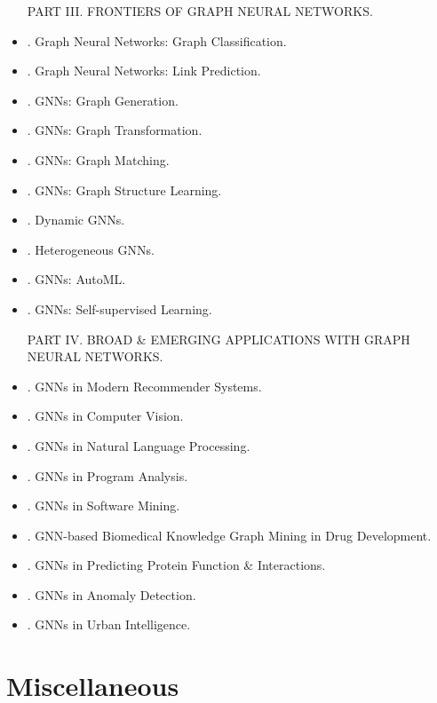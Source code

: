 \documentclass{article}
\begin{document}
\begin{itemize}
    PART III. FRONTIERS OF GRAPH NEURAL NETWORKS.
    \item {. Graph Neural Networks: Graph Classification.}
    \item {. Graph Neural Networks: Link Prediction.}
    \item {. GNNs: Graph Generation.}
    \item {. GNNs: Graph Transformation.}
    \item {. GNNs: Graph Matching.}
    \item {. GNNs: Graph Structure Learning.}
    \item {. Dynamic GNNs.}
    \item {. Heterogeneous GNNs.}
    \item {. GNNs: AutoML.}
    \item {. GNNs: Self-supervised Learning.}

    PART IV. BROAD \& EMERGING APPLICATIONS WITH GRAPH NEURAL NETWORKS.
    \item {. GNNs in Modern Recommender Systems.}
    \item {. GNNs in Computer Vision.}
    \item {. GNNs in Natural Language Processing.}
    \item {. GNNs in Program Analysis.}
    \item {. GNNs in Software Mining.}
    \item {. GNN-based Biomedical Knowledge Graph Mining in Drug Development.}
    \item {. GNNs in Predicting Protein Function \& Interactions.}
    \item {. GNNs in Anomaly Detection.}
    \item {. GNNs in Urban Intelligence.}
\end{itemize}


\section{Miscellaneous}


\printbibliography[heading=bibintoc]
\end{document}
